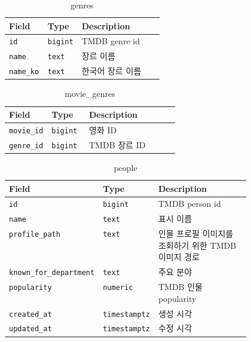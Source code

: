 \documentclass[11pt,a4paper]{article}
\renewcommand{\arraystretch}{1.18}
\begin{document}
\begin{table}[H]
\centering
\footnotesize
\setlength{\tabcolsep}{5pt}
\renewcommand{\arraystretch}{1.28}
\begin{tabularx}{\linewidth}{@{}>{\RaggedRight\arraybackslash}p{0.25\linewidth}>{\RaggedRight\arraybackslash}p{0.22\linewidth}>{\RaggedRight\arraybackslash}X@{}}
\toprule
\textbf{Field} & \textbf{Type} & \textbf{Description} \\
\midrule
\texttt{id} & \texttt{bigint} & TMDB genre id \\
\texttt{name} & \texttt{text} & 장르 이름 \\
\texttt{name\_\allowbreak{}ko} & \texttt{text} & 한국어 장르 이름 \\
\bottomrule
\end{tabularx}
\caption{genres}
\end{table}

\begin{table}[H]
\centering
\footnotesize
\setlength{\tabcolsep}{5pt}
\renewcommand{\arraystretch}{1.28}
\begin{tabularx}{\linewidth}{@{}>{\RaggedRight\arraybackslash}p{0.25\linewidth}>{\RaggedRight\arraybackslash}p{0.22\linewidth}>{\RaggedRight\arraybackslash}X@{}}
\toprule
\textbf{Field} & \textbf{Type} & \textbf{Description} \\
\midrule
\texttt{movie\_\allowbreak{}id} & \texttt{bigint} & 영화 ID \\
\texttt{genre\_\allowbreak{}id} & \texttt{bigint} & TMDB 장르 ID \\
\bottomrule
\end{tabularx}
\caption{movie\_genres}
\end{table}

\begin{table}[H]
\centering
\footnotesize
\setlength{\tabcolsep}{5pt}
\renewcommand{\arraystretch}{1.28}
\begin{tabularx}{\linewidth}{@{}>{\RaggedRight\arraybackslash}p{0.25\linewidth}>{\RaggedRight\arraybackslash}p{0.22\linewidth}>{\RaggedRight\arraybackslash}X@{}}
\toprule
\textbf{Field} & \textbf{Type} & \textbf{Description} \\
\midrule
\texttt{id} & \texttt{bigint} & TMDB person id \\
\texttt{name} & \texttt{text} & 표시 이름 \\
\texttt{profile\_\allowbreak{}path} & \texttt{text} & 인물 프로필 이미지를 조회하기 위한 TMDB 이미지 경로 \\
\texttt{known\_\allowbreak{}for\_\allowbreak{}department} & \texttt{text} & 주요 분야 \\
\texttt{popularity} & \texttt{numeric} & TMDB 인물 popularity \\
\texttt{created\_\allowbreak{}at} & \texttt{timestamptz} & 생성 시각 \\
\texttt{updated\_\allowbreak{}at} & \texttt{timestamptz} & 수정 시각 \\
\bottomrule
\end{tabularx}
\caption{people}
\end{table}
\end{document}
